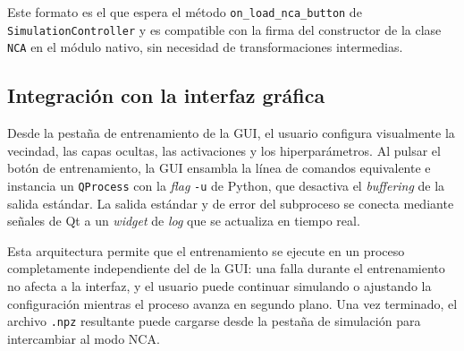 Este formato es el que espera el método \texttt{on\_load\_nca\_button} de \texttt{SimulationController} y es compatible con la firma del constructor de la clase \texttt{NCA} en el módulo nativo, sin necesidad de transformaciones intermedias.

\subsection{Integración con la interfaz gráfica}

Desde la pestaña de entrenamiento de la GUI, el usuario configura visualmente la vecindad, las capas ocultas, las activaciones y los hiperparámetros. Al pulsar el botón de entrenamiento, la GUI ensambla la línea de comandos equivalente e instancia un \texttt{QProcess} con la \textit{flag} \texttt{-u} de Python, que desactiva el \textit{buffering} de la salida estándar. La salida estándar y de error del subproceso se conecta mediante señales de Qt a un \textit{widget} de \textit{log} que se actualiza en tiempo real.

Esta arquitectura permite que el entrenamiento se ejecute en un proceso completamente independiente del de la GUI: una falla durante el entrenamiento no afecta a la interfaz, y el usuario puede continuar simulando o ajustando la configuración mientras el proceso avanza en segundo plano. Una vez terminado, el archivo \texttt{.npz} resultante puede cargarse desde la pestaña de simulación para intercambiar al modo NCA.
